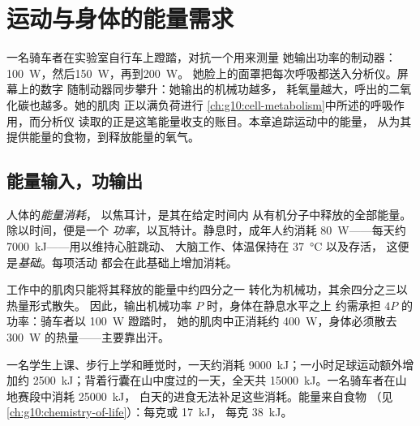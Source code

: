 \chapter{运动与身体的能量需求}\label{ch:g10:exercise-and-energy}

一名骑车者在实验室自行车上蹬踏，对抗一个用来测量
她输出功率的制动器：\qty{100}{W}，然后\qty{150}{W}，再到\qty{200}{W}。
她脸上的面罩把每次呼吸都送入分析仪。屏幕上的数字
随制动器同步攀升：她输出的机械功越多，
耗氧量越大，呼出的二氧化碳也越多。她的肌肉
正以满负荷进行
\cref{ch:g10:cell-metabolism}中所述的呼吸作用，而分析仪
读取的正是这笔能量收支的账目。本章追踪运动中的能量，
从为其提供能量的食物，到释放能量的氧气。

\section{能量输入，功输出}

\begin{definition}[能量消耗]\label{def:g10:exercise-and-energy:expenditure}
人体的\emph{能量消耗}，
以焦耳计，是其在给定时间内
从有机分子中释放的全部能量。除以时间，便是一个
\emph{功率}，以瓦特计。静息时，成年人约消耗
\qty{80}{W}——每天约 \qty{7000}{kJ}——用以维持心脏跳动、
大脑工作、体温保持在 \qty{37}{\celsius} 以及存活，
这便是\emph{基础}。每项活动
都会在此基础上增加消耗。
\end{definition}

\begin{proposition}[能量去向]\label{prop:g10:exercise-and-energy:efficiency}
工作中的肌肉只能将其释放的能量中约四分之一
转化为机械功，其余四分之三以热量形式散失。
因此，输出机械功率 $P$ 时，身体在静息水平之上
约需承担 $4P$ 的功率：骑车者以 \qty{100}{W} 蹬踏时，
她的肌肉中正消耗约 \qty{400}{W}，身体必须散去
\qty{300}{W} 的热量——主要靠出汗。
\end{proposition}
\admitted

\begin{example}[每日能量预算]\label{ex:g10:exercise-and-energy:budgets}
一名学生上课、步行上学和睡觉时，一天约消耗
\qty{9000}{kJ}；一小时足球运动额外增加约
\qty{2500}{kJ}；背着行囊在山中度过的一天，全天共
\qty{15000}{kJ}。一名骑车者在山地赛段中消耗 \qty{25000}{kJ}，
白天的进食无法补足这些消耗。能量来自食物
（见\cref{ch:g10:chemistry-of-life}）：每克或 \qty{17}{kJ}，
每克 \qty{38}{kJ}。
\end{example}

